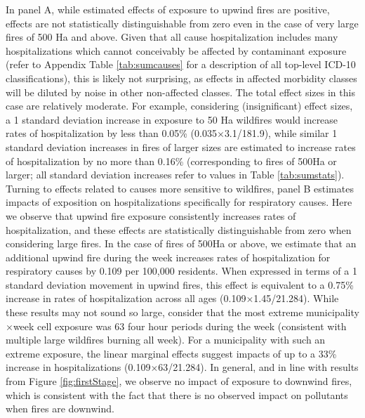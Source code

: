\documentclass[11pt]{article}
\begin{document}
\begin{spacing}{1.5}
In panel A, while estimated effects of exposure to upwind fires are positive, effects are not statistically distinguishable from zero even in the case of very large fires of 500 Ha and above.  Given that all cause hospitalization includes many hospitalizations which cannot conceivably be affected by contaminant exposure (refer to Appendix Table \ref{tab:sumcauses} for a description of all top-level ICD-10 classifications), this is likely not surprising, as effects in affected morbidity classes will be diluted by noise in other non-affected classes.  The total effect sizes in this case are relatively moderate.  For example, considering (insignificant) effect sizes, a 1 standard deviation increase in exposure to 50 Ha wildfires would increase rates of hospitalization by less than 0.05\% (0.035$\times$3.1/181.9), while similar 1 standard deviation increases in fires of larger sizes are estimated to increase rates of hospitalization by no more than 0.16\% (corresponding to fires of 500Ha or larger; all standard deviation increases refer to values in Table \ref{tab:sumstats}).  Turning to effects related to causes more sensitive to wildfires, panel B estimates impacts of exposition on hospitalizations specifically for respiratory causes.  Here we observe that upwind fire exposure consistently increases rates of hospitalization, and these effects are statistically distinguishable from zero when considering large fires.  In the case of fires of 500Ha or above, we estimate that an additional upwind fire during the week increases rates of hospitalization for respiratory causes by 0.109 per 100,000 residents.  When expressed in terms of a 1 standard deviation movement in upwind fires, this effect is equivalent to a 0.75\% increase in rates of hospitalization across all ages (0.109$\times$1.45/21.284). While these results may not sound so large, consider that the most extreme municipality$\times$week cell exposure was 63 four hour periods during the week (consistent with multiple large wildfires burning all week).  For a municipality with such an extreme exposure, the linear marginal effects suggest impacts of up to a 33\% increase in hospitalizations (0.109$\times$63/21.284). In general, and in line with results from Figure \ref{fig:firstStage}, we observe no impact of exposure to downwind fires, which is consistent with the fact that there is no observed impact on pollutants when fires are downwind.




\end{spacing}
\end{document}
